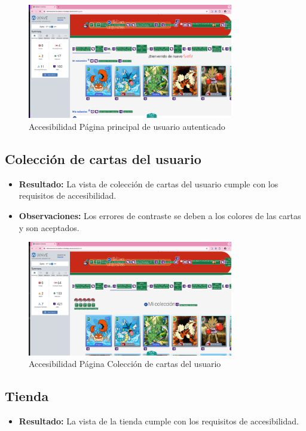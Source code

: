 \begin{figure}[H]
    \centering
    \includegraphics[width=0.8\textwidth]{figures/accesibilidad/A-acc-logued.png}
    \caption{Accesibilidad Página principal de usuario autenticado}
    \label{fig:Acc-Principal-Usuario}
\end{figure}

\subsection*{Colección de cartas del usuario}
\begin{itemize}
    \item \textbf{Resultado:} La vista de colección de cartas del usuario cumple con los requisitos de accesibilidad.
    \item \textbf{Observaciones:} Los errores de contraste se deben a los colores de las cartas y son aceptados.
\end{itemize}

\begin{figure}[H]
    \centering
    \includegraphics[width=0.8\textwidth]{figures/accesibilidad/A-acc-coleccion.png}
    \caption{Accesibilidad Página Colección de cartas del usuario}
    \label{fig:Acc-Coleccion}
\end{figure}


\subsection*{Tienda}
\begin{itemize}
    \item \textbf{Resultado:} La vista de la tienda cumple con los requisitos de accesibilidad.
\end{itemize}

